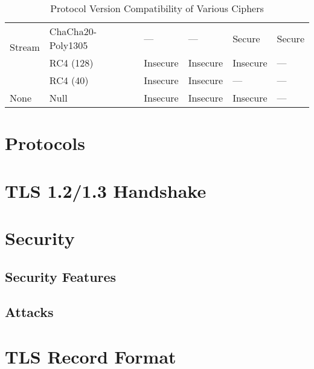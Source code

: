 \documentclass[11pt]{scrartcl} %
\begin{document}
\begin{table}[H]
\begin{tabular}{|p{2cm}|p{3cm}|p{2cm}|p{2cm}|p{2cm}|p{2cm}|}
        \multirow{2}{*}{Stream} & ChaCha20-Poly1305 & — & — & Secure & Secure \\ \cline{2-6}
         & RC4 (128) & Insecure & Insecure & Insecure & — \\ \cline{2-6}
         & RC4 (40) & Insecure & Insecure & — & — \\ \hline
         
        None & Null & Insecure & Insecure & Insecure & — \\ \hline
    \end{tabular}
    \caption{Protocol Version Compatibility of Various Ciphers}
\end{table}


\section{Protocols}




\section{TLS 1.2/1.3 Handshake}
\label{sec:tls_handshake}


\section{Security}

\subsection{Security Features}

\subsection{Attacks}

\section{TLS Record Format}
\end{document}

